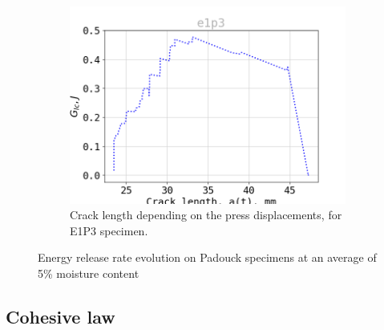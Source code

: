 \begin{figure}[H]
\begin{subfigure}{0.48\linewidth}
	\centering
	\includegraphics[scale=0.3]{Figures/e1p3_G}
	\decoRule
	\caption[Crack length E1P3]{Crack length depending on the press displacements, for E1P3 specimen.}
	\label{fig:E1P3_G}
\end{subfigure}
\caption{Energy release rate evolution on Padouck specimens at an average of 5\% moisture content}
\label{E1p_G}
\end{figure}
\newpage
\subsection{Cohesive law}

